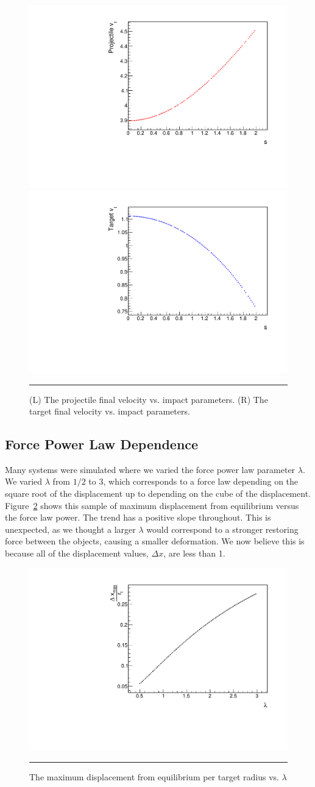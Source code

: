 \documentclass[aps,prl,floatfix,preprint,nofootinbib]{revtex4}
\begin{document}
\begin{figure}[h!]
  \includegraphics[width=.45\linewidth]{plots/trend_plots/pvf_vs_s.pdf}
  \includegraphics[width=.45\linewidth]{plots/trend_plots/tvf_vs_s.pdf}
                  {\par\nobreak\rule[9pt]{35em}{0.5pt}\vspace{-5mm}}
                  \caption{(L) The projectile final velocity vs. impact parameters. (R) The target final velocity vs. impact parameters.}
                  \label{fig:changing_s2}
\end{figure}

\subsection{Force Power Law Dependence}
Many systems were simulated where we varied the force power law parameter $\lambda$. We varied $\lambda$ from $1/2$ to $3$, which corresponds to a force law depending on the square root of the displacement up to depending on the cube of the displacement. Figure~\ref{fig:changing_lambda} shows this sample of maximum displacement from equilibrium versus the force law power. The trend has a positive slope throughout. This is unexpected, as we thought a larger $\lambda$ would correspond to a stronger restoring force between the objects, causing a smaller deformation. We now believe this is because all of the displacement values, $\Delta x$, are less than 1.
\begin{figure}[h!]
  \includegraphics[width=.45\linewidth]{plots/trend_plots/dxmax_vs_lambda.pdf}
                  {\par\nobreak\rule[9pt]{35em}{0.5pt}\vspace{-5mm}}
                  \caption{The maximum displacement from equilibrium per target radius vs. $\lambda$}
                  \label{fig:changing_lambda}
\end{figure}
\end{document}
